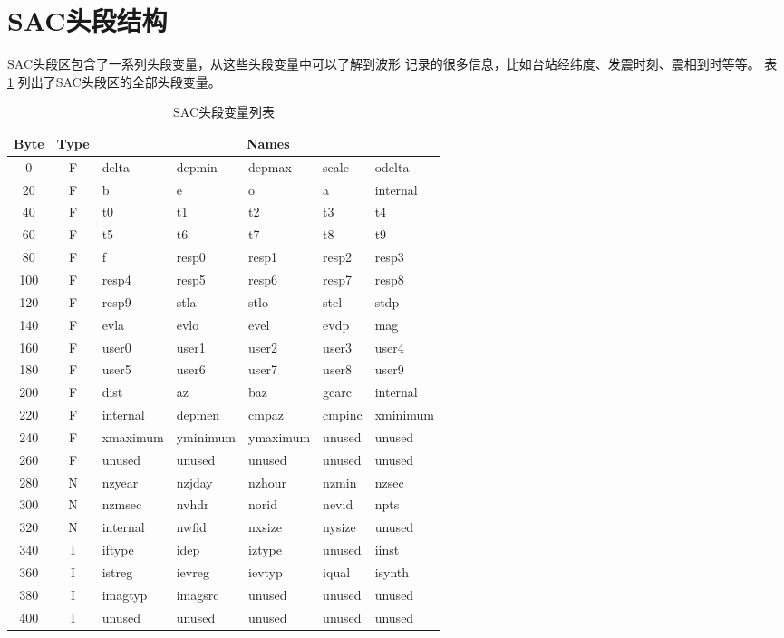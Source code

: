 \section{SAC头段结构}
SAC头段区包含了一系列头段变量，从这些头段变量中可以了解到波形
记录的很多信息，比如台站经纬度、发震时刻、震相到时等等。
表 \ref{table:header-variables} 列出了SAC头段区的全部头段变量。

\begin{table}[H]
\ttfamily
\small
\centering
\caption{SAC头段变量列表}
\label{table:header-variables}
\begin{tabular}{c|c|lllll}
\toprule
Byte	&	Type	&	\multicolumn{5}{c}{Names}\\
\midrule
0		&	F	&	delta	&	depmin	&	depmax	&	scale	&	odelta	\\
20		&	F	&	b		&	e		&	o		&	a		&	internal\\
40		&	F	&	t0		&	t1		&	t2		&	t3		&	t4		\\
60		&	F	&	t5		&	t6		&	t7		&	t8		&	t9		\\
80		&	F	&	f		&	resp0	&	resp1	&	resp2	&	resp3	\\
100		&	F	&	resp4	&	resp5	&	resp6	&	resp7	&	resp8	\\
120		&	F	&	resp9	&	stla	&	stlo	&	stel	&	stdp	\\
140		&	F	&	evla	&	evlo	&	evel	&	evdp	&	mag		\\
160		&	F	&	user0	&	user1	&	user2	&	user3	&	user4	\\
180		&	F	&	user5	&	user6	&	user7	&	user8	&	user9	\\
200		&	F	&	dist	&	az		&	baz		&	gcarc	&	internal\\
220		&	F	&	internal&	depmen	&	cmpaz	&	cmpinc	&	xminimum\\
240		&	F	&	xmaximum&	yminimum&	ymaximum&	unused	&	unused	\\
260		&	F	&	unused	&	unused	&	unused	&	unused	&	unused	\\
280		&	N	&	nzyear	&	nzjday	&	nzhour	&	nzmin	&	nzsec	\\
300		&	N	&	nzmsec	&	nvhdr	&	norid	&	nevid	&	npts	\\
320		&	N	&	internal&	nwfid	&	nxsize	&	nysize	&	unused	\\
340		&	I	&	iftype	&	idep	&	iztype	&	unused	&	iinst	\\
360		&	I	&	istreg	&	ievreg	&	ievtyp	&	iqual	&	isynth	\\
380		&	I	&	imagtyp &	imagsrc	&	unused	&	unused	&	unused	\\
400		&	I	&	unused	&	unused	&	unused	&	unused	&	unused	\\

\end{tabular}
\end{table}
